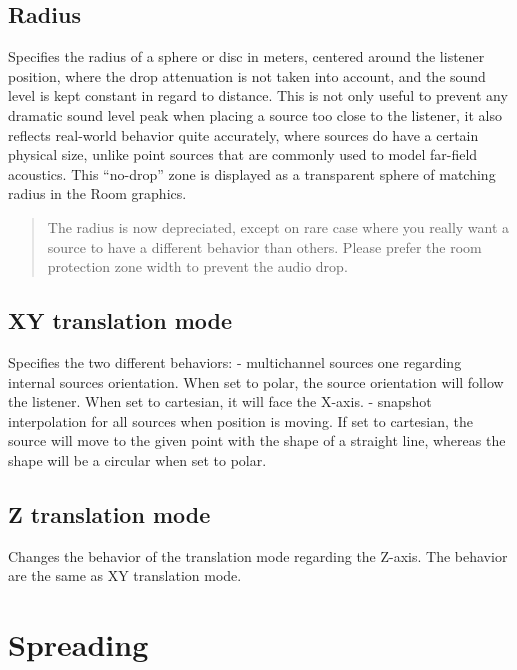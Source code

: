 \documentclass[
  letterpaper,
  DIV=11,
  numbers=noendperiod]{scrreport}
\begin{document}
\hypertarget{radius}{%
\subsection{Radius}\label{radius}}

Specifies the radius of a sphere or disc in meters, centered around the
listener position, where the drop attenuation is not taken into account,
and the sound level is kept constant in regard to distance. This is not
only useful to prevent any dramatic sound level peak when placing a
source too close to the listener, it also reflects real-world behavior
quite accurately, where sources do have a certain physical size, unlike
point sources that are commonly used to model far-field acoustics. This
``no-drop'' zone is displayed as a transparent sphere of matching radius
in the Room graphics.

\begin{quote}
The radius is now depreciated, except on rare case where you really want
a source to have a different behavior than others. Please prefer the
room protection zone width to prevent the audio drop.
\end{quote}

\hypertarget{xy-translation-mode}{%
\subsection{XY translation mode}\label{xy-translation-mode}}

Specifies the two different behaviors: - multichannel sources one
regarding internal sources orientation. When set to polar, the source
orientation will follow the listener. When set to cartesian, it will
face the X-axis. - snapshot interpolation for all sources when position
is moving. If set to cartesian, the source will move to the given point
with the shape of a straight line, whereas the shape will be a circular
when set to polar.

\hypertarget{z-translation-mode}{%
\subsection{Z translation mode}\label{z-translation-mode}}

Changes the behavior of the translation mode regarding the Z-axis. The
behavior are the same as XY translation mode.

\hypertarget{spreading}{%
\section{Spreading}\label{spreading}}
\end{document}

